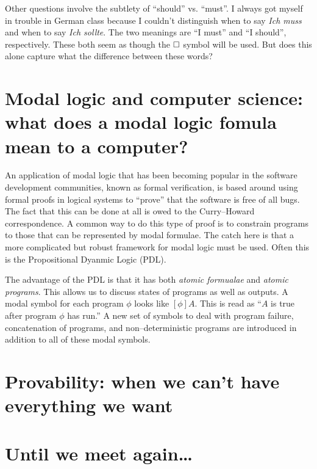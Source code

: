 Other questions involve the subtlety of ``should'' vs. ``must''. I always got myself in trouble in German class because I couldn't distinguish
when to say \emph{Ich muss} and when to say \emph{Ich sollte}. The two meanings are ``I must'' and ``I should'', respectively. These both seem
as though the $\square$ symbol will be used. But does this alone capture what the difference between these words? 

\section{Modal logic and computer science: what does a modal logic fomula mean to a computer?}
An application of modal logic that has been becoming popular in the software development communities, known as formal verification, is based
around using formal proofs in logical systems to ``prove'' that the software is free of all bugs. The fact that this can be done at all
is owed to the Curry--Howard correspondence. A common way to do this type of proof is to constrain programs to those that can be represented
by modal formulae. The catch here is that a more complicated but robust framework for modal logic must be used. Often this is the Propositional
Dyanmic Logic (PDL).

The advantage of the PDL is that it has both \emph{atomic formualae} and \emph{atomic programs}. This allows us to discuss states of programs
as well as outputs. A modal symbol for each program $\phi$ looks like $[\phi]A$. This is read as ``$A$ is true after program $\phi$ has run.''
A new set of symbols to deal with program failure, concatenation of programs, and non--deterministic programs are introduced in addition to all
of these modal symbols.

\section{Provability: when we can't have everything we want}

\section{Until we meet again\dots}